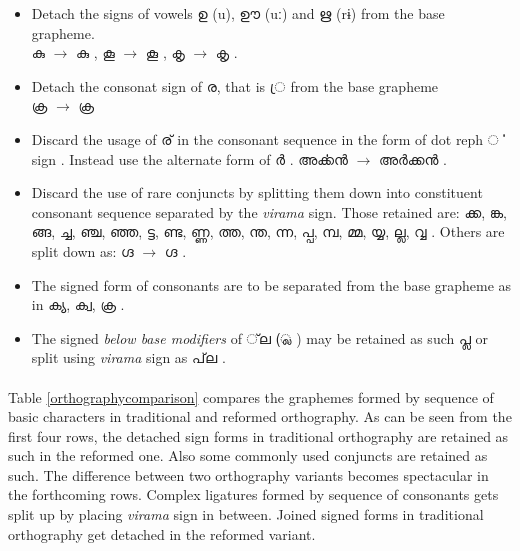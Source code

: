 \documentclass[10pt]{article}
\begin{document}
\begin{itemize}
\item
Detach the signs of vowels {\manjari ഉ} (u), {\manjari ഊ} (uː) and {\manjari ഋ} (rɨ) from the base grapheme.\\ 
{\manjari കു } $\rightarrow$ {\raghu കു }, 
{\manjari കൂ } $\rightarrow$ {\raghu കൂ }, 
{\manjari കൃ } $\rightarrow$ {\raghu കൃ }.
\item 
Detach the consonat sign of  {\manjari  ര}, that is {\manjari  ്ര } from the base grapheme \\
{\manjari ക്ര  } $\rightarrow$ {\raghu ക്ര  } 
\item
Discard the usage of {\manjari ര് } in the consonant sequence in the form of dot reph {\manjari ൎ }  sign .  Instead use the alternate form of {\manjari ർ }. {\manjari അൎക്കൻ } $\rightarrow$ {\manjari അർക്കൻ }. 

\item
Discard the use of rare conjuncts by splitting them down into constituent consonant sequence separated by the \textit{virama} sign. Those retained are: {\manjari ക്ക, ങ്ക, ങ്ങ, ച്ച, ഞ്ച, ഞ്ഞ, ട്ട, ണ്ട, ണ്ണ, ത്ത, ന്ത, ന്ന, പ്പ, മ്പ, മ്മ, യ്യ, ല്ല, വ്വ }. Others are split down as: {\manjari ഗ്ദ } $\rightarrow$ {\raghu ഗ്ദ }. 

\item
The signed form of consonants are to be separated from the base grapheme as in {\raghu ക്യ, ക്വ, ക്ര }.

\item
The signed \textit{below base modifiers} of {\manjari  ്‌ല  (്ല )  } may be retained as such {\manjari പ്ല } or split using \textit{virama} sign as {\manjari  പ്‌ല }.

\end{itemize}

\paragraph{}
Table \ref{orthographycomparison} compares the graphemes formed by sequence of basic characters in traditional and reformed orthography. As can be seen from the first four rows, the detached sign forms in traditional orthography are retained as such in the reformed one. Also some commonly used conjuncts are retained as such. The difference between two orthography variants becomes spectacular in the forthcoming rows. Complex ligatures formed by sequence of consonants gets split up by placing \textit{virama} sign in between. Joined signed forms in traditional orthography get detached in the reformed variant.
\end{document}
